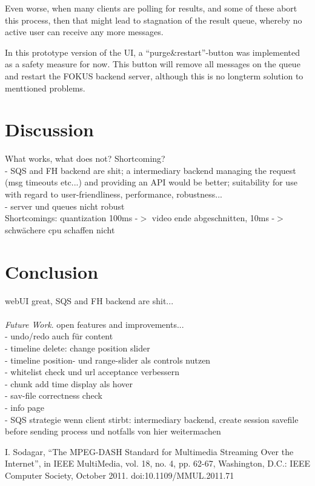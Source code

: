 \documentclass[conference]{IEEEtran}
\begin{document}
Even worse, when many clients are polling for results, and some of these abort this process, then that might lead to stagnation of the result queue, whereby no active user can receive any more messages.

In this prototype version of the UI, a ``purge\&restart''-button was implemented as a safety measure for now.
This button will remove all messages on the queue and restart the FOKUS backend server, although this is no longterm solution to menttioned problems.

\section{Discussion}
What works, what does not? Shortcoming?\\

- SQS and FH backend are shit; a intermediary backend managing the request (msg timeouts etc...) and providing an API would be better; suitability for use with regard to user-friendliness, performance, robustness... \\
- server und queues nicht robust \\
Shortcomings: quantization 100ms -$>$ video ende abgeschnitten, 10ms -$>$ schwächere cpu schaffen nicht\\

\section{Conclusion}
webUI great, SQS and FH backend are shit...
\\\\
\textit{Future Work}. open features and improvements... \\
- undo/redo auch für content \\
- timeline delete: change position slider \\
- timeline position- und range-slider als controls nutzen \\
- whitelist check und url acceptance verbessern \\
- chunk add time display als hover \\
- sav-file correctness check \\
- info page \\
- SQS strategie wenn client stirbt: intermediary backend, create session savefile before sending process und notfalls von hier weitermachen \\

\begin{thebibliography}{00}
 I. Sodagar, ``The MPEG-DASH Standard for Multimedia Streaming Over the Internet'', in IEEE MultiMedia, vol. 18, no. 4, pp. 62-67, Washington, D.C.: IEEE Computer Society, October 2011. doi:10.1109/MMUL.2011.71
\end{thebibliography}
\end{document}
